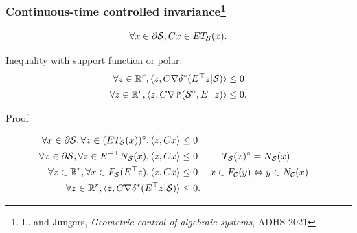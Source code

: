 \documentclass{beamer}
\DeclareMathOperator{\gauge}{g}
\begin{document}
\begin{frame}
  \frametitle{Continuous-time controlled invariance\footnote{L. and Jungers, \emph{Geometric control of algebraic systems}, ADHS 2021}}

  \vspace{-1em}



  \[ \forall x \in \partial \mathcal{S}, C x \in E T_{\mathcal{S}}(x). \]

  \vspace{-1em}

  Inequality with support function or polar:
  \begin{align*}
    \forall z \in \mathbb{R}^r, \la z, C \grad \supfun{E^\Tr z}{\Sset} \ra & \le 0\\
    \forall z \in \mathbb{R}^r, \la z, C \grad \gauge(\polar{\Sset}, E^\Tr z) \ra & \le 0.
  \end{align*}

  \vspace{-1em}

  \begin{block}{Proof}

  \vspace{-1em}

  \begin{align*}
    \forall x \in \partial \mathcal{S}, \forall z \in (ET_{\mathcal{S}}(x))^\circ, \langle z, Cx \rangle & \le 0\\
    \forall x \in \partial \mathcal{S}, \forall z \in E^{-\top} N_{\mathcal{S}}(x), \langle z, Cx \rangle & \le 0 & T_{\mathcal{S}}(x)^\circ & = N_{\mathcal{S}}(x)\\
    \forall z \in \mathbb{R}^r, \forall x \in F_{\mathcal{S}}(E^\top z), \langle z, Cx \rangle & \le 0 & x \in F_{\mathcal{C}}(y) & \Leftrightarrow y \in N_{\mathcal{C}}(x)\\
    \forall z \in \mathbb{R}^r, \langle z, C \nabla \delta^*(E^\top z|\mathcal{S}) \rangle & \le 0.
  \end{align*}

  \vspace{-1em}

  \end{block}

\end{frame}
\end{document}
